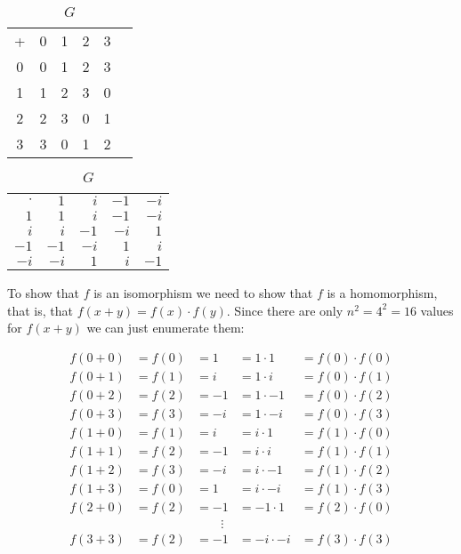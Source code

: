 \documentclass{article}
\theoremstyle{definition}
\begin{document}
\bigskip
\begin{table}[ht]
\begin{minipage}{0.5\linewidth} 
\centering
\begin{tabular}{c | c c c c c} 
+ & 0 & 1  & 2 & 3 \\
\cline{1-5}
0 & 0 & 1 & 2 & 3 \\
1 & 1 & 2 & 3 & 0 \\
2 & 2 & 3 & 0 & 1 \\
3 & 3 & 0 & 1 & 2
\end{tabular}
\caption{$\mathbb{Z}_4$} 
\label{tab:z4}
\end{minipage}
%
 \begin{minipage}{0.5\linewidth} 
\centering
\begin{tabular}{r | r r r r} 
$\cdot$ & $1$ & $i$  & $-1$ & $-i$ \\
\cline{1-5}
$1$     & $1$   & $i$   & $-1$  & $-i$ \\
$i$     & $i$   & $-1$  & $-i$  & $1$  \\
$-1$    & $-1$  & $-i$  & $1$   & $i$  \\
$-i$    &  $-i$ & $1$   & $i$   & $-1$
\end{tabular}
\caption{$G$} 
\label{tab:G}
\end{minipage}
\end{table}

\bigskip
\noindent
To show that $f$ is an isomorphism we need to show that $f$ is a
homomorphism, that is, that $f(x+y) = f(x) \cdot f(y)$.  Since
there are only $n^2 = 4^2 = 16$ values for $f(x+y)$ we can just
enumerate them:

\begin{equation*}
\begin{array}{lllll}
f(0+0) &= f(0) &=  1	&=   1 \cdot  1 &=  f(0) \cdot f(0) \\
f(0+1) &= f(1) &=  i	&=   1 \cdot  i &=  f(0) \cdot f(1) \\
f(0+2) &= f(2) &= -1    &=   1 \cdot -1 &=  f(0) \cdot f(2) \\
f(0+3) &= f(3) &= -i    &=   1 \cdot -i &=  f(0) \cdot f(3) \\
f(1+0) &= f(1) &=  i	&=   i \cdot  1 &=  f(1) \cdot f(0) \\
f(1+1) &= f(2) &= -1    &=   i \cdot  i &=  f(1) \cdot f(1) \\
f(1+2) &= f(3) &= -i    &=   i \cdot -1 &=  f(1) \cdot f(2) \\
f(1+3) &= f(0) &=  1	&=   i \cdot -i &=  f(1) \cdot f(3) \\
f(2+0) &= f(2) &= -1    &=  -1 \cdot  1 &=  f(2) \cdot f(0) \\
&& \qquad \vdots                                            \\
f(3+3) &= f(2) &= -1    &=  -i \cdot -i &=  f(3) \cdot f(3)
\end{array}
\end{equation*}
\end{document}
